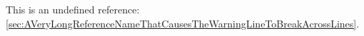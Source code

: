 \documentclass{article}
\begin{document}
This is an undefined reference: \ref{sec:AVeryLongReferenceNameThatCausesTheWarningLineToBreakAcrossLines}.
\end{document}
